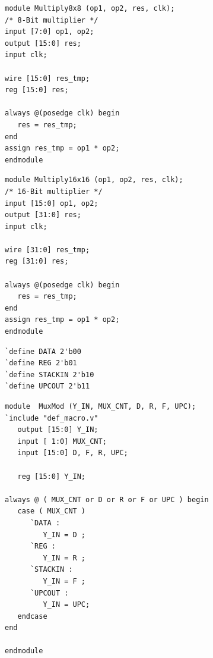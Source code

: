 \begin{lstlisting}[caption={Multiply8x8.v},label=ex:mult8-v]
module Multiply8x8 (op1, op2, res, clk);
/* 8-Bit multiplier */
input [7:0] op1, op2;
output [15:0] res;
input clk;

wire [15:0] res_tmp;
reg [15:0] res;

always @(posedge clk) begin
   res = res_tmp;
end
assign res_tmp = op1 * op2;
endmodule
\end{lstlisting}

\begin{lstlisting}[caption={Multiply16x16.v},label=ex:mult16-v]
module Multiply16x16 (op1, op2, res, clk);
/* 16-Bit multiplier */
input [15:0] op1, op2;
output [31:0] res;
input clk;

wire [31:0] res_tmp;
reg [31:0] res;

always @(posedge clk) begin
   res = res_tmp;
end
assign res_tmp = op1 * op2;
endmodule
\end{lstlisting}

\begin{lstlisting}[caption={def\_macro.v},label=ex:defmacro]
`define DATA 2'b00
`define REG 2'b01
`define STACKIN 2'b10
`define UPCOUT 2'b11
\end{lstlisting}

\begin{lstlisting}[caption={MuxMod.v},label=ex:muxmod-v]
module  MuxMod (Y_IN, MUX_CNT, D, R, F, UPC);
`include "def_macro.v"
   output [15:0] Y_IN;
   input [ 1:0] MUX_CNT;
   input [15:0] D, F, R, UPC;

   reg [15:0] Y_IN;

always @ ( MUX_CNT or D or R or F or UPC ) begin
   case ( MUX_CNT )
      `DATA :
         Y_IN = D ;
      `REG :
         Y_IN = R ;
      `STACKIN :
         Y_IN = F ;
      `UPCOUT :
         Y_IN = UPC;
   endcase
end

endmodule
\end{lstlisting}

